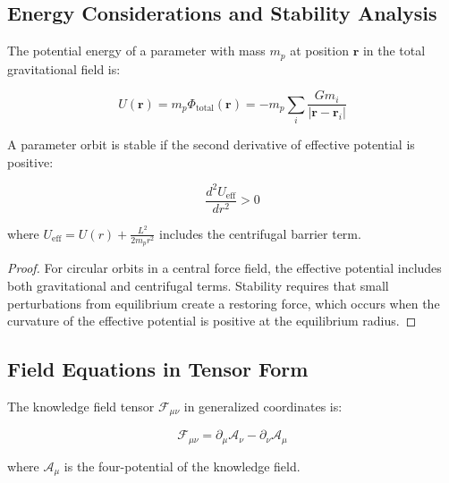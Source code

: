 \subsection{Energy Considerations and Stability Analysis}

\begin{definition}
The potential energy of a parameter with mass $m_p$ at position $\mathbf{r}$ in the total gravitational field is:

\begin{equation}
U(\mathbf{r}) = m_p \Phi_{\text{total}}(\mathbf{r}) = -m_p \sum_i \frac{G m_i}{|\mathbf{r} - \mathbf{r}_i|}
\end{equation}
\end{definition}

\begin{theorem}
A parameter orbit is stable if the second derivative of effective potential is positive:

\begin{equation}
\frac{d^2 U_{\text{eff}}}{dr^2} > 0
\end{equation}

where $U_{\text{eff}} = U(r) + \frac{L^2}{2m_p r^2}$ includes the centrifugal barrier term.
\end{theorem}

\begin{proof}
For circular orbits in a central force field, the effective potential includes both gravitational and centrifugal terms. Stability requires that small perturbations from equilibrium create a restoring force, which occurs when the curvature of the effective potential is positive at the equilibrium radius.
\end{proof}

\subsection{Field Equations in Tensor Form}

\begin{definition}
The knowledge field tensor $\mathcal{F}_{\mu\nu}$ in generalized coordinates is:

\begin{equation}
\mathcal{F}_{\mu\nu} = \partial_\mu \mathcal{A}_\nu - \partial_\nu \mathcal{A}_\mu
\end{equation}

where $\mathcal{A}_\mu$ is the four-potential of the knowledge field.
\end{definition}

